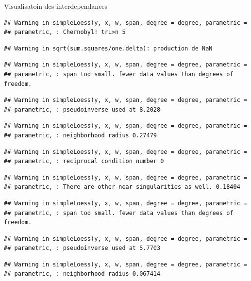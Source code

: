 \documentclass[11pt,ignorenonframetext,]{beamer}
\begin{document}
\begin{frame}[fragile]{Visualisatoin des interdependances}
\begin{verbatim}
## Warning in simpleLoess(y, x, w, span, degree = degree, parametric =
## parametric, : Chernobyl! trL>n 5
\end{verbatim}

\begin{verbatim}
## Warning in sqrt(sum.squares/one.delta): production de NaN
\end{verbatim}

\begin{verbatim}
## Warning in simpleLoess(y, x, w, span, degree = degree, parametric =
## parametric, : span too small. fewer data values than degrees of freedom.
\end{verbatim}

\begin{verbatim}
## Warning in simpleLoess(y, x, w, span, degree = degree, parametric =
## parametric, : pseudoinverse used at 8.2028
\end{verbatim}

\begin{verbatim}
## Warning in simpleLoess(y, x, w, span, degree = degree, parametric =
## parametric, : neighborhood radius 0.27479
\end{verbatim}

\begin{verbatim}
## Warning in simpleLoess(y, x, w, span, degree = degree, parametric =
## parametric, : reciprocal condition number 0
\end{verbatim}

\begin{verbatim}
## Warning in simpleLoess(y, x, w, span, degree = degree, parametric =
## parametric, : There are other near singularities as well. 0.18404
\end{verbatim}

\begin{verbatim}
## Warning in simpleLoess(y, x, w, span, degree = degree, parametric =
## parametric, : span too small. fewer data values than degrees of freedom.
\end{verbatim}

\begin{verbatim}
## Warning in simpleLoess(y, x, w, span, degree = degree, parametric =
## parametric, : pseudoinverse used at 5.7703
\end{verbatim}

\begin{verbatim}
## Warning in simpleLoess(y, x, w, span, degree = degree, parametric =
## parametric, : neighborhood radius 0.067414
\end{verbatim}


\end{frame}
\end{document}
